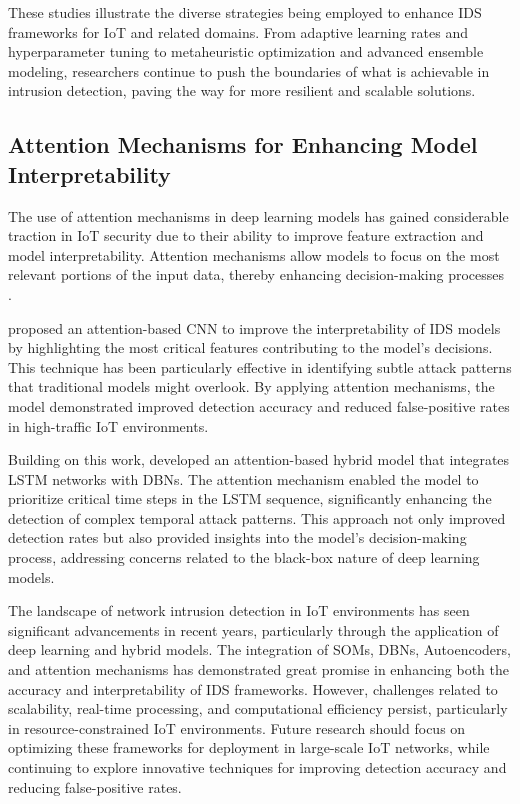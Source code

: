 These studies illustrate the diverse strategies being employed to enhance IDS frameworks for IoT and related domains. From adaptive learning rates and hyperparameter tuning to metaheuristic optimization and advanced ensemble modeling, researchers continue to push the boundaries of what is achievable in intrusion detection, paving the way for more resilient and scalable solutions.

\subsection{Attention Mechanisms for Enhancing Model Interpretability}

The use of attention mechanisms in deep learning models has gained considerable traction in IoT security due to their ability to improve feature extraction and model interpretability. Attention mechanisms allow models to focus on the most relevant portions of the input data, thereby enhancing decision-making processes \cite{xiao2024exploration, xu2024attention}.

\citet{sarker2024enhancing} proposed an attention-based CNN to improve the interpretability of IDS models by highlighting the most critical features contributing to the model's decisions. This technique has been particularly effective in identifying subtle attack patterns that traditional models might overlook. By applying attention mechanisms, the model demonstrated improved detection accuracy and reduced false-positive rates in high-traffic IoT environments.

Building on this work, \citet{admass2024arrhythmia} developed an attention-based hybrid model that integrates LSTM networks with DBNs. The attention mechanism enabled the model to prioritize critical time steps in the LSTM sequence, significantly enhancing the detection of complex temporal attack patterns. This approach not only improved detection rates but also provided insights into the model's decision-making process, addressing concerns related to the black-box nature of deep learning models.

The landscape of network intrusion detection in IoT environments has seen significant advancements in recent years, particularly through the application of deep learning and hybrid models. The integration of SOMs, DBNs, Autoencoders, and attention mechanisms has demonstrated great promise in enhancing both the accuracy and interpretability of IDS frameworks. However, challenges related to scalability, real-time processing, and computational efficiency persist, particularly in resource-constrained IoT environments. Future research should focus on optimizing these frameworks for deployment in large-scale IoT networks, while continuing to explore innovative techniques for improving detection accuracy and reducing false-positive rates.

